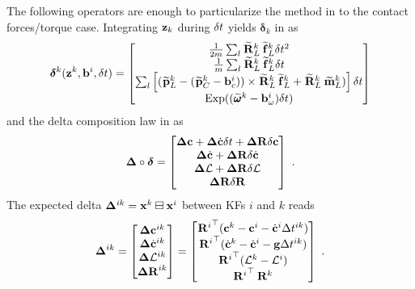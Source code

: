 The following operators are enough to particularize the method in  to the contact forces/torque case.
Integrating ${\bf z}_k$ during $\delta t$ yields $\bm\delta_k$ in  as
%
\begin{equation}
        \bm\delta^{k}({\bf z}^k, {\bf b}^i, \delta t) =
        \begin{bmatrix}
        \frac{1}{2m} \sum_l \prescript{}{}{\widetilde{{\bf R}}}_{L}^k \prescript{}{}{\widetilde{{\bf f}}}_{L}^k \delta t^2
        \\
        \frac{1}{m} \sum_l \prescript{}{}{\widetilde{{\bf R}}}_{L}^k \prescript{}{}{\widetilde{{\bf f}}}_{L}^k \delta t 
        \\
        \sum_l\left[ (\prescript{}{}{\widetilde{{\bf p}}}_{L}^k - (\prescript{}{}{\widetilde{{\bf p}}}_{C}^k - {\bf b}_c^i)) \times \prescript{}{}{\widetilde{{\bf R}}}_{L}^k \prescript{}{}{\widetilde{{\bf f}}}_{L}^k + \prescript{}{}{\widetilde{{\bf R}}}_{L}^k\prescript{}{}{\widetilde{\bf m}}_{L}^k) \right] \delta t
        \\
        \operatorname*{Exp}((\prescript{}{}{\widetilde{\pmb{\omega}}}_{}^k - {\bf b}_{\omega}^i)\delta t)
        \end{bmatrix}
    \normalsize
\end{equation}
%
and the delta composition law in  as
%
\begin{equation}
    \D \circ \bm\delta = 
    \begin{bmatrix}
    \D\COM + \D\COMd \dt + \DR  \delta\COM
    \\
    \D\COMd + \DR  \delta \COMd
    \\
    \D\AM + \DR  \delta \AM
    \\
    \DR\dR
    \end{bmatrix}
    ~.
    \label{eq:DeltaDTCompo}
\end{equation}
%
The expected delta ${{\bm \Delta}}^{ik}={\bf x}^k\boxminus{\bf x}^i$ between KFs $i$ and $k$ reads
%
\begin{equation}
    {{\bm \Delta}}^{ik} =
    \begin{bmatrix}
    {{\bm \Delta}}{\bf c}^{ik} \\ {{\bm \Delta}}\dot{{\bf c}}^{ik} \\ {{\bm \Delta}}\mathcal{L}^{ik} \\ {\bm \Delta {\bf R}}^{ik}
    \end{bmatrix}
    =
    \begin{bmatrix}
        {\prescript{}{}{{\bf R}}_{}^i}^{\top} ({\bf c}^k - {\bf c}^i - \dot{{\bf c}}^i \Delta t^{ik})
        \\
        {\prescript{}{}{{\bf R}}_{}^i}^{\top} (\dot{{\bf c}}^{k} - \dot{{\bf c}}^{i} - {\bf g} \Delta t^{ik})
        \\
        {\prescript{}{}{{\bf R}}_{}^i}^{\top} (\mathcal{L}^{k} - \mathcal{L}^{i})
        \\
        {\prescript{}{}{{\bf R}}_{}^i}^{\top} \prescript{}{}{{\bf R}}_{}^k
    \end{bmatrix}~.
\end{equation}

